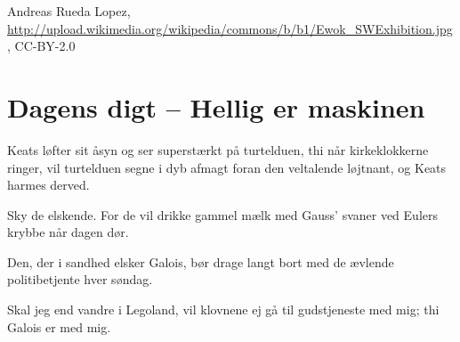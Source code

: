 \begin{minipage}[t]{100mm}
\begin{center}
\tiny Andreas Rueda Lopez, \url{http://upload.wikimedia.org/wikipedia/commons/b/b1/Ewok_SWExhibition.jpg}, CC-BY-2.0
\end{center}

\section*{Dagens digt -- Hellig er maskinen}
\begin{center}
Keats løfter sit åsyn og ser superstærkt på turtelduen, thi når kirkeklokkerne ringer, vil turtelduen segne i dyb afmagt foran den veltalende løjtnant, og Keats harmes derved.

Sky de elskende. For de vil drikke gammel mælk med Gauss' svaner ved Eulers krybbe når dagen dør.

Den, der i sandhed elsker Galois, bør drage langt bort med de ævlende politibetjente hver søndag.

Skal jeg end vandre i Legoland, vil klovnene ej gå til gudstjeneste med mig; thi Galois er med mig.
\end{center}
\end{minipage}
